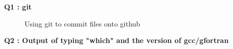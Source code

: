 \documentclass{article}
\begin{document}
\textbf{Q1 : git\\}
\begin{figure}[h]
    \centering
    \caption{Using git to commit files onto github}
    \label{gversion}
\end{figure}
\textbf{Q2 : Output of typing "which" and the version of gcc/gfortran}
\end{document}
